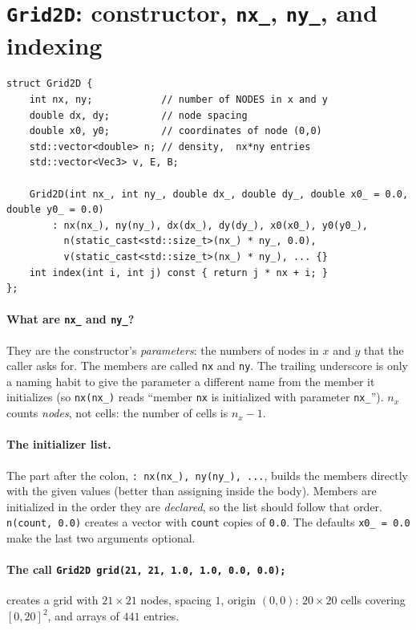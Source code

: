 \documentclass[11pt,a4paper]{article}
\begin{document}
\section{\texttt{Grid2D}: constructor, \texttt{nx\_}, \texttt{ny\_}, and indexing}

\begin{lstlisting}
struct Grid2D {
    int nx, ny;            // number of NODES in x and y
    double dx, dy;         // node spacing
    double x0, y0;         // coordinates of node (0,0)
    std::vector<double> n; // density,  nx*ny entries
    std::vector<Vec3> v, E, B;

    Grid2D(int nx_, int ny_, double dx_, double dy_, double x0_ = 0.0, double y0_ = 0.0)
        : nx(nx_), ny(ny_), dx(dx_), dy(dy_), x0(x0_), y0(y0_),
          n(static_cast<std::size_t>(nx_) * ny_, 0.0),
          v(static_cast<std::size_t>(nx_) * ny_), ... {}
    int index(int i, int j) const { return j * nx + i; }
};
\end{lstlisting}

\paragraph{What are \texttt{nx\_} and \texttt{ny\_}?} They are the constructor's \emph{parameters}:
the numbers of nodes in $x$ and $y$ that the caller asks for. The members are called \texttt{nx} and
\texttt{ny}. The trailing underscore is only a naming habit to give the parameter a different name from
the member it initializes (so \texttt{nx(nx\_)} reads ``member \texttt{nx} is initialized with parameter
\texttt{nx\_}''). $n_x$ counts \emph{nodes}, not cells: the number of cells is $n_x-1$.

\paragraph{The initializer list.} The part after the colon, \lstinline|: nx(nx_), ny(ny_), ...|, builds the
members directly with the given values (better than assigning inside the body). Members are initialized in the
order they are \emph{declared}, so the list should follow that order. \lstinline|n(count, 0.0)| creates
a vector with \texttt{count} copies of \texttt{0.0}. The defaults \lstinline|x0_ = 0.0| make the last two
arguments optional.

\paragraph{The call \lstinline|Grid2D grid(21, 21, 1.0, 1.0, 0.0, 0.0);|} creates a grid with $21\times21$
nodes, spacing $1$, origin $(0,0)$: $20\times20$ cells covering $[0,20]^2$, and arrays of $441$ entries.
\end{document}
